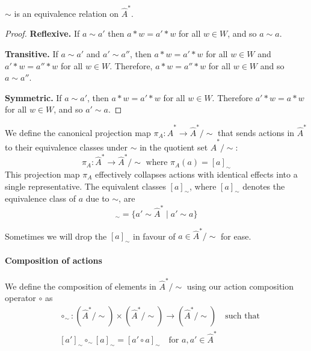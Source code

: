 \begin{proposition}
    $\sim$ is an equivalence relation on $\hat{A}^{\ast}$.
\end{proposition}
\begin{proof}
    \textbf{Reflexive.}
    If $a \sim a'$ then $a \ast w = a' \ast w$ for all $w \in W$, and so $a \sim a$.

    \textbf{Transitive.}
    If $a \sim a'$ and $a' \sim a''$, then $a \ast w = a' \ast w$ for all $w \in W$ and $a' \ast w = a'' \ast w$ for all $w \in W$.
    Therefore, $a \ast w = a'' \ast w$ for all $w \in W$ and so $a \sim a''$.

    \textbf{Symmetric.}
    If $a \sim a'$, then $a \ast w = a' \ast w$ for all $w \in W$.
    Therefore $a' \ast w = a \ast w$ for all $w \in W$, and so $a' \sim a$.
\end{proof}

We define the canonical projection map $\pi_{A}: \hat{A}^{\ast} \to \hat{A}^{\ast}/\sim$ that sends actions in $\hat{A}^{\ast}$ to their equivalence classes under $\sim$ in the quotient set $\hat{A}^{\ast}/\sim$:
\begin{equation}
    \pi_{A}: \hat{A}^{\ast} \to \hat{A}^{\ast}/\sim \text{ where } \pi_{A}(a) = [a]_{\sim}
\end{equation}
This projection map $\pi_{A}$ effectively collapses actions with identical effects into a single representative.
The equivalent classes $[a]_{\sim}$, where $[a]_{\sim}$ denotes the equivalence class of $a$ due to $\sim$, are
\begin{equation}
    [a]_{\sim} = \{ a' \sim \hat{A}^{\ast} \mid a' \sim a \}
\end{equation}



Sometimes we will drop the $[a]_{\sim}$ in favour of $a \in \hat{A}^{\ast}/\sim$ for ease.

\paragraph{Composition of actions}
We define the composition of elements in $\hat{A}^{\ast}/\sim$ using our action composition operator $\circ$ as
\begin{equation}
    \begin{aligned}
         & \circ_{\sim}: (\hat{A}^{\ast}/\sim) \times (\hat{A}^{\ast}/\sim) \to (\hat{A}^{\ast}/\sim) \quad \text{such that} \\
         & [a']_{\sim} \circ_{\sim} [a]_{\sim} = [a' \circ a]_{\sim} \quad \text{for $a,a' \in \hat{A}^{\ast}$}
    \end{aligned}
\end{equation}


